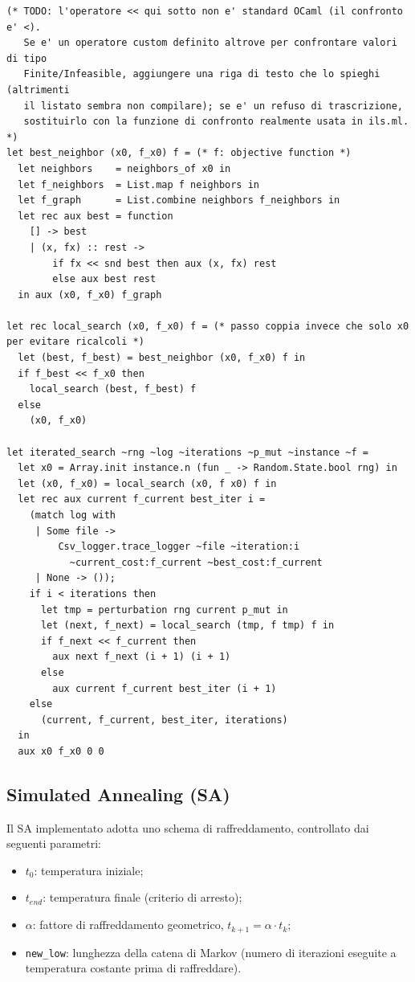 \documentclass[11pt,a4paper]{article}
\begin{document}
\begin{lstlisting}[caption={Local search e iterated search in OCaml.}, label={lst:iterated_search}]
(* TODO: l'operatore << qui sotto non e' standard OCaml (il confronto e' <).
   Se e' un operatore custom definito altrove per confrontare valori di tipo
   Finite/Infeasible, aggiungere una riga di testo che lo spieghi (altrimenti
   il listato sembra non compilare); se e' un refuso di trascrizione,
   sostituirlo con la funzione di confronto realmente usata in ils.ml. *)
let best_neighbor (x0, f_x0) f = (* f: objective function *)
  let neighbors    = neighbors_of x0 in
  let f_neighbors  = List.map f neighbors in
  let f_graph      = List.combine neighbors f_neighbors in
  let rec aux best = function
    [] -> best
    | (x, fx) :: rest ->
        if fx << snd best then aux (x, fx) rest
        else aux best rest
  in aux (x0, f_x0) f_graph

let rec local_search (x0, f_x0) f = (* passo coppia invece che solo x0 per evitare ricalcoli *)
  let (best, f_best) = best_neighbor (x0, f_x0) f in
  if f_best << f_x0 then
    local_search (best, f_best) f
  else
    (x0, f_x0)

let iterated_search ~rng ~log ~iterations ~p_mut ~instance ~f =
  let x0 = Array.init instance.n (fun _ -> Random.State.bool rng) in
  let (x0, f_x0) = local_search (x0, f x0) f in
  let rec aux current f_current best_iter i =
    (match log with
     | Some file ->
         Csv_logger.trace_logger ~file ~iteration:i
           ~current_cost:f_current ~best_cost:f_current
     | None -> ());
    if i < iterations then
      let tmp = perturbation rng current p_mut in
      let (next, f_next) = local_search (tmp, f tmp) f in
      if f_next << f_current then
        aux next f_next (i + 1) (i + 1)
      else
        aux current f_current best_iter (i + 1)
    else
      (current, f_current, best_iter, iterations)
  in
  aux x0 f_x0 0 0
\end{lstlisting}

\subsection{Simulated Annealing (SA)}

Il SA implementato adotta uno schema di raffreddamento, controllato dai seguenti parametri:

\begin{itemize}
    \item $t_0$: temperatura iniziale;
    \item $t_{end}$: temperatura finale (criterio di arresto);
    \item $\alpha$: fattore di raffreddamento geometrico, $t_{k+1} = \alpha \cdot t_k$;
    \item \verb|new_low|: lunghezza della catena di Markov (numero di iterazioni eseguite a temperatura costante prima di raffreddare).
\end{itemize}
\end{document}
